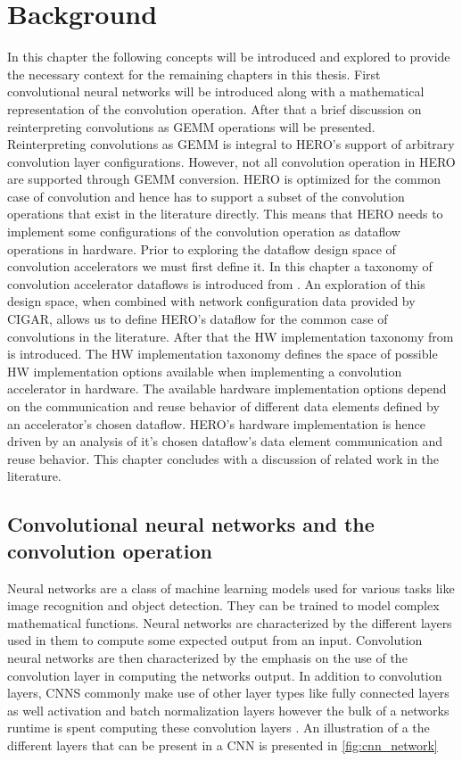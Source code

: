 \chapter{Background}
\label{chap:background:intro}

In this chapter the following concepts will be introduced and explored to
provide the necessary context for the remaining chapters in this thesis. First
convolutional neural networks will be introduced along with a mathematical
representation of the convolution operation. After that a brief discussion on
reinterpreting convolutions as GEMM operations will be presented. Reinterpreting
convolutions as GEMM is integral to HERO's support of arbitrary convolution
layer configurations. However, not all convolution operation in HERO are
supported through GEMM conversion. HERO is optimized for the common case of
convolution and hence has to support a subset of the convolution operations that
exist in the literature directly. This means that HERO needs to implement some
configurations of the convolution operation as
dataflow operations in hardware. Prior to exploring the dataflow design space of
convolution accelerators we must first define it. 
In this chapter a taxonomy of convolution accelerator dataflows
is introduced from \cite{infamous_stanford}. An exploration of
this design space, when combined with network configuration data provided by
CIGAR, allows us to define HERO's dataflow for the common case of convolutions
in the literature. After that the HW implementation
taxonomy from \cite{maestro} is introduced. The HW implementation taxonomy
defines the space of possible HW implementation options available when
implementing a convolution accelerator in hardware. The available hardware
implementation options depend on the communication and reuse behavior of
different data elements defined by an accelerator's chosen dataflow. HERO's
hardware implementation is hence driven by an analysis of it's chosen dataflow's
data element communication and reuse behavior. This chapter
concludes with a discussion of related work in the literature. 

\clearpage

\section{Convolutional neural networks and the convolution operation}
\label{chap:background:cnns_and_conv}

Neural networks are a class of machine learning models used for various tasks
like image recognition and object detection. They can be trained to model
complex mathematical functions. Neural networks are characterized by the
different layers used in them to compute some expected output from an input.
Convolution neural networks are then characterized by the emphasis on the use of
the convolution layer in computing the networks output. In addition to
convolution layers, CNNS commonly make use of other layer types like fully
connected layers as well activation and batch normalization layers
however the bulk of a networks runtime is spent computing these convolution
layers \cite{most_of_the_runtime}. An illustration of a
the different layers that can be present in a CNN is presented in
\autoref{fig:cnn_network}

